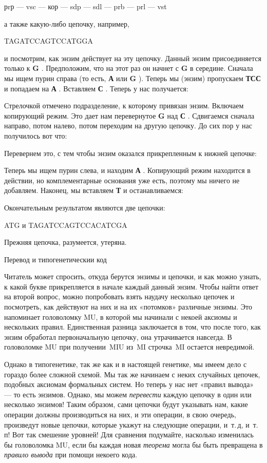 \documentclass[../main.tex]{subfiles}
\begin{document}
рrр --- vsc --- кор --- sdp --- sdl --- prb --- prl --- vst

а также какую-либо цепочку, например,

TAGATCCAGTCCATGGA

и посмотрим, как энзим действует на эту цепочку. Данный энзим присоединяется только к \textbf{G} . Предположим, что на этот раз он начнет с \textbf{G} в середине. Сначала мы ищем пурин справа (то есть, \textbf{А} или \textbf{G} ). Теперь мы (энзим) пропускаем \textbf{ТСС} и попадаем на \textbf{А} . Вставляем \textbf{С} . Теперь у нас получается:

Стрелочкой отмечено подразделение, к которому привязан энзим. Включаем копирующий режим. Это дает нам перевернутое \textbf{G} над \textbf{С} . Сдвигаемся сначала направо, потом налево, потом переходим на другую цепочку. До сих пор у нас получилось вот что:

Перевернем это, с тем чтобы энзим оказался прикрепленным к нижней цепочке:

Теперь мы ищем пурин слева, и находим \textbf{А} . Копирующий режим находится в действии, но комплементарные основания уже есть, поэтому мы ничего не добавляем. Наконец, мы вставляем \textbf{Т} и останавливаемся:

Окончательным результатом являются две цепочки:

ATG и TAGATCCAGTCCACATCGA

Прежняя цепочка, разумеется, утеряна.

Перевод и типогенетическии код

Читатель может спросить, откуда берутся энзимы и цепочки, и как можно узнать, к какой букве прикрепляется в начале каждый данный энзим. Чтобы найти ответ на второй вопрос, можно попробовать взять наудачу несколько цепочек и посмотреть, как действуют на них и на их «потомков» различные энзимы. Это напоминает головоломку MU, в которой мы начинали с некоей аксиомы и нескольких правил. Единственная разница заключается в том, что после того, как энзим обработал первоначальную цепочку, она утрачивается навсегда. В головоломке MU при получении~MIU из~MI строчка~MI остается невредимой.

Однако в типогенетике, так же как и в настоящей генетике, мы имеем дело с гораздо более сложной схемой. Мы так же начинаем с неких случайных цепочек, подобных аксиомам формальных систем. Но теперь у нас нет «правил вывода» --- то есть энзимов. Однако, мы можем \emph{перевести} каждую цепочку в один или несколько энзимов! Таким образом, сами цепочки будут указывать нам, какие операции должны производиться на них, и эти операции, в свою очередь, произведут новые цепочки, которые укажут на следующие операции, и~т.\,д, и~т.\,п! Вот так смешение уровней! Для сравнения подумайте, насколько изменилась бы головоломка MU, если бы каждая новая \emph{теорема} могла бы быть превращена в \emph{правило вывода} при помощи некоего кода.
\end{document}
